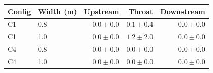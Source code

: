 \begin{tabular}{@{}llrrr@{}}
\toprule
\textbf{Config} & \textbf{Width (m)} & \textbf{Upstream} & \textbf{Throat} & \textbf{Downstream} \\
\midrule
C1 & 0.8 & $0.0 \pm 0.0$ & $0.1 \pm 0.4$ & $0.0 \pm 0.0$ \\
C1 & 1.0 & $0.0 \pm 0.0$ & $1.2 \pm 2.0$ & $0.0 \pm 0.0$ \\
C4 & 0.8 & $0.0 \pm 0.0$ & $0.0 \pm 0.0$ & $0.0 \pm 0.0$ \\
C4 & 1.0 & $0.0 \pm 0.0$ & $0.0 \pm 0.0$ & $0.0 \pm 0.0$ \\
\bottomrule
\end{tabular}